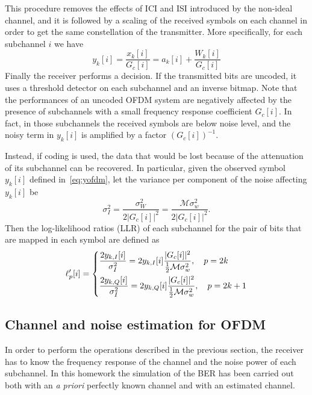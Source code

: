 \documentclass[10pt]{article}
\newcommand{\ofdM} {\mathcal{M}}
\begin{document}
This procedure removes the effects of ICI and ISI introduced by the non-ideal channel, and it is followed by a scaling of the received symbols on each channel in order to get the same constellation of the transmitter. More specifically, for each subchannel $i$ we have
\begin{equation}
	y_k[i] = \frac{x_k[i]}{G_c[i]} = a_k[i] + \frac{W_k[i]}{G_c[i]}
	\label{eq:yofdm}
\end{equation}
Finally the receiver performs a decision. If the transmitted bits are uncoded, it uses a threshold detector on each subchannel and an inverse bitmap. Note that the performances of an uncoded OFDM system are negatively affected by the presence of subchannels with a small frequency response coefficient $G_c[i]$. In fact, in those subchannels the received symbols are below noise level, and the noisy term in $y_k[i]$ is amplified by a factor $(G_c[i])^{-1}$.

Instead, if coding is used, the data that would be lost because of the attenuation of its subchannel can be recovered. In particular, given the observed symbol $y_k[i]$ defined in~\eqref{eq:yofdm}, let the variance per component of the noise affecting $y_k[i]$ be
\begin{equation}
	\sigma_I^2 = \frac{\sigma_W^2}{2 |G_c[i]|^2} = \frac{\ofdM \sigma_w^2}{2 |G_c[i]|^2}.
\end{equation}
Then the log-likelihood ratios (LLR) of each subchannel for the pair of bits that are mapped in each symbol are defined as
\begin{equation}
\ell'_p[i] =
	\begin{dcases}
	\frac{2 y_{k,I}[i]}{\sigma_I^2} = 2 y_{k,I}[i] \frac{|G_c[i]|^2 }{\frac{1}{2} \ofdM \sigma_w^2}, \quad p = 2k \\
	\frac{2 y_{k,Q}[i]}{\sigma_I^2} = 2 y_{k,Q}[i] \frac{|G_c[i]|^2 }{\frac{1}{2} \ofdM \sigma_w^2}, \quad p = 2k+1 \\
	\end{dcases}
\end{equation}

\subsection*{Channel and noise estimation for OFDM}
In order to perform the operations described in the previous section, the receiver has to know the frequency response of the channel and the noise power of each subchannel. In this homework the simulation of the BER has been carried out both with an \textit{a priori} perfectly known channel and with an estimated channel. 
\end{document}
